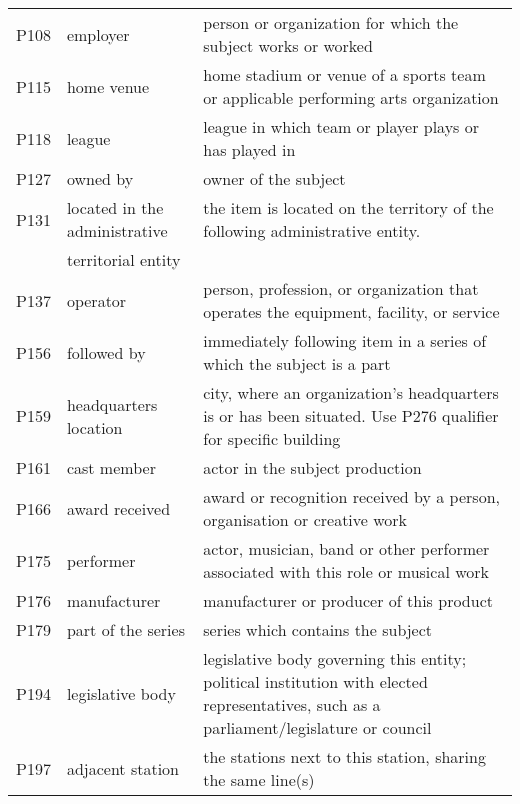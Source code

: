 \documentclass[11pt]{article}
\begin{document}
\begin{table*}[!t]
{\begin{tabular}{lll}
    P108 & employer & person or organization for which the subject works or worked \\
    P115 & home venue & home stadium or venue of a sports team or applicable performing arts organization \\
    P118 & league & league in which team or player plays or has played in \\
    P127 & owned by & owner of the subject \\
    P131 & located in the administrative & the item is located on the territory of the following administrative entity. \\
    & territorial entity  & \\
    P137 & operator & person, profession, or organization that operates the equipment, facility, or service \\
    P156 & followed by & immediately following item in a series of which the subject is a part \\
    P159 & headquarters location & city, where an organization's headquarters is or has been situated. Use P276 qualifier for specific building \\
    P161 & cast member & actor in the subject production \\
    P166 & award received & award or recognition received by a person, organisation or creative work \\                                                       
P175 & performer & actor, musician, band or other performer associated with this role or musical work \\                                                  
P176 & manufacturer & manufacturer or producer of this product \\                                                                                         P179 & part of the series & series which contains the subject \\                                                                                          
P194 & legislative body & legislative body governing this entity; political institution with elected representatives, such as a parliament/legislature or council \\                                                                                                                                                
P197 & adjacent station & the stations next to this station, sharing the same line(s) \\                                                                  

\end{tabular}}
\end{table*}
\end{document}
